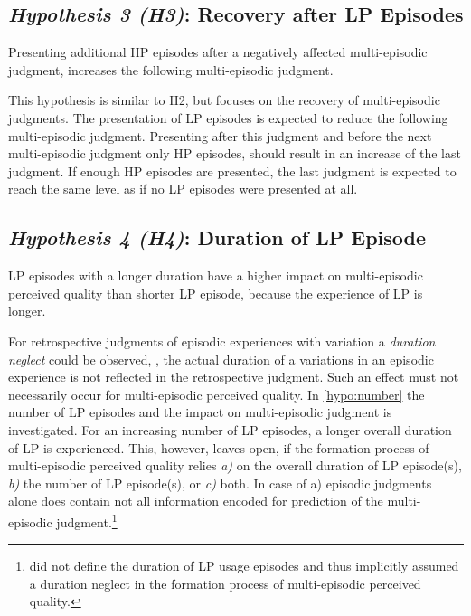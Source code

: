 
\subsection*{\emph{Hypothesis 3 (H3)}: Recovery after \ac{LP} Episodes}
\begin{hypothesis}[H3]\label{hypo:recovery}
Presenting additional \ac{HP} episodes after a negatively affected multi-episodic judgment, increases the following multi-episodic judgment.
\end{hypothesis}

This hypothesis is similar to H2, but focuses on the recovery of multi-episodic judgments.
The presentation of \ac{LP} episodes is expected to reduce the following multi-episodic judgment.
Presenting after this judgment and before the next multi-episodic judgment only \ac{HP} episodes, should result in an increase of the last judgment.
If enough \ac{HP} episodes are presented, the last judgment is expected to reach the same level as if no \ac{LP} episodes were presented at all.


\subsection*{\emph{Hypothesis 4 (H4)}: Duration of \ac{LP} Episode}
\begin{hypothesis}[H4]\label{hypo:duration}
\ac{LP} episodes with a longer duration have a higher impact on multi-episodic perceived quality than shorter \ac{LP} episode, because the experience of \ac{LP} is longer.
\end{hypothesis}

For retrospective judgments of episodic experiences with variation a \emph{duration neglect} could be observed, \ie, the actual duration of a variations in an episodic experience is not reflected in the retrospective judgment.
Such an effect must not necessarily occur for multi-episodic perceived quality.
In \autoref{hypo:number} the number of \ac{LP} episodes and the impact on multi-episodic judgment is investigated.
For an increasing number of \ac{LP} episodes, a longer overall duration of \ac{LP} is experienced.
This, however, leaves open, if the formation process of multi-episodic perceived quality relies \emph{a)} on the overall duration of \ac{LP} episode(s), \emph{b)} the number of \ac{LP} episode(s), or \emph{c)} both.
In case of a) episodic judgments alone does contain not all information encoded for prediction of the multi-episodic judgment.\footnote{\cite[p. 2]{moller_single-call_2011} did not define the duration of \ac{LP} usage episodes and thus implicitly assumed a duration neglect in the formation process of multi-episodic perceived quality.}


